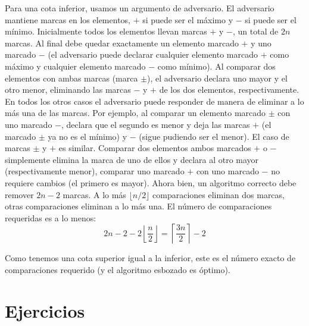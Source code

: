   Para una cota inferior,
  usamos un argumento de adversario.
  El adversario mantiene marcas en los elementos,
  \(+\) si puede ser el máximo y \(-\) si puede ser el mínimo.
  Inicialmente todos los elementos llevan marcas \(+\) y \(-\),
  un total de \(2 n\) marcas.
  Al final debe quedar exactamente un elemento marcado \(+\)
  y uno marcado \(-\)
  (el adversario puede declarar cualquier elemento marcado \(+\) como máximo
   y cualquier elemento marcado \(-\) como mínimo).
  Al comparar dos elementos con ambas marcas
  (marca \(\pm\)),
  el adversario declara uno mayor y el otro menor,
  eliminando las marcas \(-\) y \(+\) de los dos elementos,
  respectivamente.
  En todos los otros casos
  el adversario puede responder
  de manera de eliminar a lo más una de las marcas.
  Por ejemplo,
  al comparar un elemento marcado \(\pm\) con uno marcado \(-\),
  declara que el segundo es menor y deja las marcas \(+\)
  (el marcado \(\pm\) ya no es el mínimo)
  y \(-\)
  (sigue pudiendo ser el menor).
  El caso de marcas \(\pm\) y \(+\) es similar.
  Comparar dos elementos ambos marcados \(+\) o \(-\)
  simplemente elimina la marca de uno de ellos y declara al otro mayor
  (respectivamente menor),
  comparar uno marcado \(+\) con uno marcado \(-\) no requiere cambios
  (el primero es mayor).
  Ahora bien,
  un algoritmo correcto debe remover \(2 n - 2\) marcas.
  A lo más \(\lfloor n / 2 \rfloor\) comparaciones eliminan dos marcas,
  otras comparaciones eliminan a lo más una.
  El número de comparaciones requeridas es a lo menos:
  \begin{equation*}
    2 n - 2 - 2 \left\lfloor \frac{n}{2} \right\rfloor
      = \left\lceil \frac{3 n}{2} \right\rceil - 2
  \end{equation*}

  Como tenemos una cota superior igual a la inferior,
  este es el número exacto de comparaciones requerido
  (y el algoritmo esbozado es óptimo).

\section*{Ejercicios}
\label{sec:ex-adversary}

